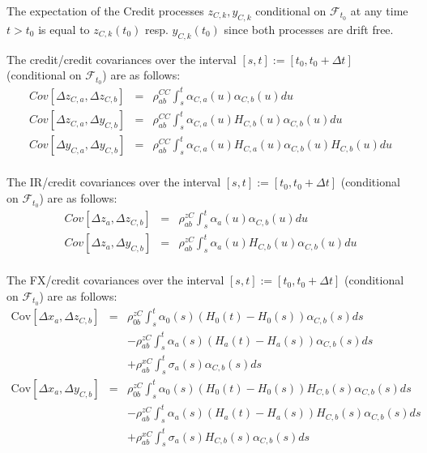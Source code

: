 The expectation of the Credit processes $z_{C,k}, y_{C,k}$ conditional on $\mathcal{F}_{t_0}$ at any time $t>t_0$ is
equal to $z_{C,k}(t_0)$ resp. $y_{C,k}(t_0)$ since both processes are drift free.

The credit/credit covariances over the interval $[s,t] := [t_0, t_0+\Delta t]$ (conditional on $\mathcal{F}_{t_0}$) are as follows:
\begin{eqnarray*}
	Cov \left[\Delta z_{C,a}, \Delta z_{C,b} \right] &=&
	\rho_{ab}^{CC}\int_s^t \alpha_{C, a}(u) \alpha_{C, b}(u) du\\
  Cov \left[\Delta z_{C,a}, \Delta y_{C,b} \right] &=&
	\rho_{ab}^{CC}\int_s^t \alpha_{C, a}(u) H_{C,b}(u) \alpha_{C, b}(u) du\\
  Cov \left[\Delta y_{C,a}, \Delta y_{C,b} \right] &=&
	\rho_{ab}^{CC}\int_s^t \alpha_{C, a}(u) H_{C,a}(u) \alpha_{C, b}(u) H_{C,b}(u) du\\
\end{eqnarray*}

The IR/credit covariances over the interval $[s,t] := [t_0, t_0+\Delta t]$ (conditional on $\mathcal{F}_{t_0}$) are as follows:
\begin{eqnarray*}
	Cov \left[\Delta z_a, \Delta z_{C,b} \right] &=&
	\rho_{ab}^{zC}\int_s^t \alpha_a(u) \alpha_{C, b}(u) du\\
  Cov \left[\Delta z_a, \Delta y_{C,b} \right] &=&
	\rho_{ab}^{zC}\int_s^t \alpha_a(u) H_{C,b}(u) \alpha_{C, b}(u) du\\
\end{eqnarray*}

The FX/credit covariances over the interval $[s,t] := [t_0, t_0+\Delta t]$ (conditional on $\mathcal{F}_{t_0}$) are as follows:
\begin{eqnarray*}
  \mathrm{Cov}[ \Delta x_a, \Delta z_{C,b} ] & = & \rho_{0b}^{zC} \int_s^t \alpha_0(s) (H_0(t)-H_0(s)) \alpha_{C,b}(s) ds \\
                                             & & -\rho_{ab}^{zC} \int_s^t \alpha_a(s)(H_a(t)-H_a(s))\alpha_{C,b}(s) ds \\
                                             & & +\rho_{ab}^{xC}\int_s^t \sigma_a(s) \alpha_{C,b}(s) ds \\
  \mathrm{Cov}[ \Delta x_a, \Delta y_{C,b} ] & = & \rho_{0b}^{zC} \int_s^t \alpha_0(s) (H_0(t)-H_0(s)) H_{C,b}(s)\alpha_{C,b}(s) ds \\
                                             & & -\rho_{ab}^{zC} \int_s^t \alpha_a(s)(H_a(t)-H_a(s))H_{C,b}(s)\alpha_{C,b}(s) ds \\
                                             & & +\rho_{ab}^{xC}\int_s^t \sigma_a(s) H_{C,b}(s)\alpha_{C,b}(s) ds
\end{eqnarray*}

